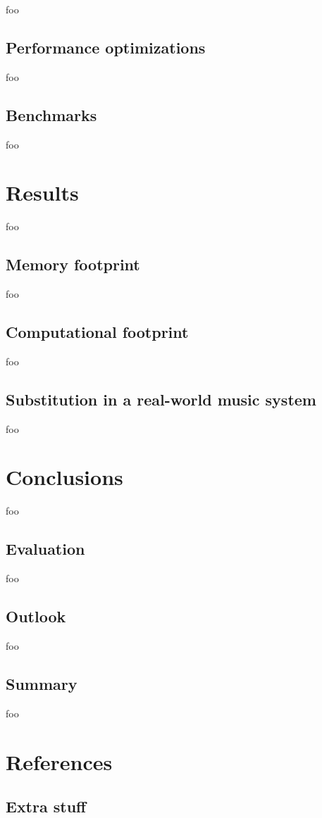 \documentclass[letter,12pt]{article}
\begin{document}
foo

\subsection{Performance optimizations}

foo

\subsection{Benchmarks}

foo

\section{Results}

foo

\subsection{Memory footprint}

foo

\subsection{Computational footprint}

foo

\subsection{Substitution in a real-world music system}

foo

\section{Conclusions}

foo

\subsection{Evaluation}

foo

\subsection{Outlook}

foo

\subsection{Summary}

foo

\vfill
\clearpage %

\section{References}
\printbibliography[heading=none]

\vfill
\clearpage %

\begin{appendices}

\section{Extra stuff}
\label{appendix:rthpss}

\end{appendices}
\end{document}
